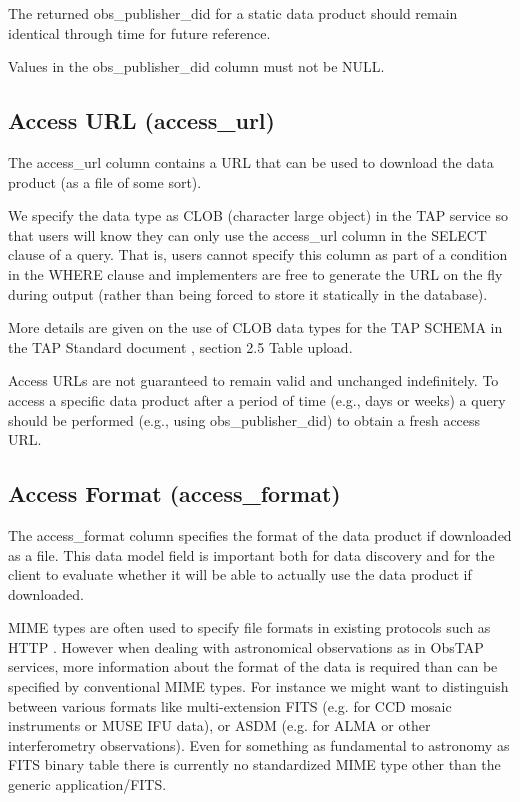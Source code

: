\documentclass[11pt,a4paper]{ivoa}
\begin{document}
The returned obs\_publisher\_did for a static data product should remain identical through time for future reference.

Values in the obs\_publisher\_did column must not be NULL.

\subsection{Access URL (access\_url)}
The access\_url column contains a URL that can be used to download the data product (as a file of some sort).

We specify the data type as CLOB (character large object) in the TAP service so that users will know they can only use
the access\_url column in the SELECT clause of a query.  That is, users cannot specify this column as part of a
condition in the WHERE clause and implementers are free to generate the URL on the fly during output (rather than being
forced to store it statically in the database).

More details are given on the use of CLOB data types for the TAP SCHEMA in the TAP Standard document
\citep{2010ivoa.spec.0327D}, section 2.5 Table upload.

Access URLs are not guaranteed to remain valid and unchanged indefinitely.  To access a specific data product after a
period of time (e.g., days or weeks) a query should be performed (e.g., using obs\_publisher\_did) to obtain a fresh
access URL.

\subsection{Access Format (access\_format)}
\label{bkm:Ref289893457}The access\_format column specifies the format of the data product if downloaded as a file. This
data model field is important both for data discovery and for the client to evaluate whether it will be able to
actually use the data product if downloaded.

MIME types are often used to specify file formats in existing protocols such as HTTP \citep{std:MIME_types}.  However
when dealing with astronomical observations as in ObsTAP services, more information about the format of the data is
required than can be specified by conventional MIME types.  For instance we might want to distinguish between various
formats like multi-extension FITS (e.g. for CCD mosaic instruments or MUSE IFU data), or ASDM (e.g. for ALMA or other
interferometry observations).  Even for something as fundamental to astronomy as FITS binary table there is currently
no standardized MIME type other than the generic application/FITS.
\end{document}
